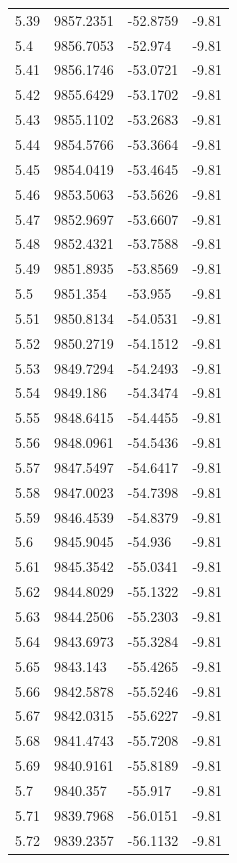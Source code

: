 \begin{table}[H]
\begin{tabular}{llll}
5.39 & 9857.2351 & -52.8759 & -9.81 \\
5.4 & 9856.7053 & -52.974 & -9.81 \\
5.41 & 9856.1746 & -53.0721 & -9.81 \\
5.42 & 9855.6429 & -53.1702 & -9.81 \\
5.43 & 9855.1102 & -53.2683 & -9.81 \\
5.44 & 9854.5766 & -53.3664 & -9.81 \\
5.45 & 9854.0419 & -53.4645 & -9.81 \\
5.46 & 9853.5063 & -53.5626 & -9.81 \\
5.47 & 9852.9697 & -53.6607 & -9.81 \\
5.48 & 9852.4321 & -53.7588 & -9.81 \\
5.49 & 9851.8935 & -53.8569 & -9.81 \\
5.5 & 9851.354 & -53.955 & -9.81 \\
5.51 & 9850.8134 & -54.0531 & -9.81 \\
5.52 & 9850.2719 & -54.1512 & -9.81 \\
5.53 & 9849.7294 & -54.2493 & -9.81 \\
5.54 & 9849.186 & -54.3474 & -9.81 \\
5.55 & 9848.6415 & -54.4455 & -9.81 \\
5.56 & 9848.0961 & -54.5436 & -9.81 \\
5.57 & 9847.5497 & -54.6417 & -9.81 \\
5.58 & 9847.0023 & -54.7398 & -9.81 \\
5.59 & 9846.4539 & -54.8379 & -9.81 \\
5.6 & 9845.9045 & -54.936 & -9.81 \\
5.61 & 9845.3542 & -55.0341 & -9.81 \\
5.62 & 9844.8029 & -55.1322 & -9.81 \\
5.63 & 9844.2506 & -55.2303 & -9.81 \\
5.64 & 9843.6973 & -55.3284 & -9.81 \\
5.65 & 9843.143 & -55.4265 & -9.81 \\
5.66 & 9842.5878 & -55.5246 & -9.81 \\
5.67 & 9842.0315 & -55.6227 & -9.81 \\
5.68 & 9841.4743 & -55.7208 & -9.81 \\
5.69 & 9840.9161 & -55.8189 & -9.81 \\
5.7 & 9840.357 & -55.917 & -9.81 \\
5.71 & 9839.7968 & -56.0151 & -9.81 \\
5.72 & 9839.2357 & -56.1132 & -9.81 \\

\end{tabular}
\end{table}
